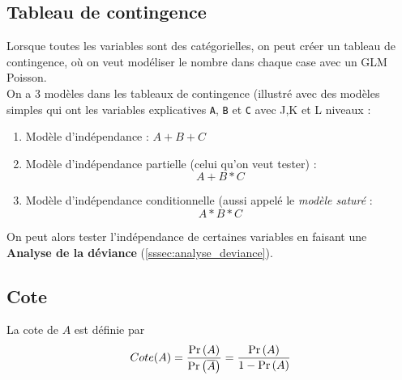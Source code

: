 \documentclass[10pt, french]{article}
\begin{document}
\begin{multicols*}{3}
\subsection*{Tableau de contingence}
Lorsque toutes les variables sont des catégorielles, on peut créer un tableau de contingence, où on veut modéliser le nombre dans chaque case avec un GLM Poisson. \\

On a 3 modèles dans les tableaux de contingence (illustré avec des modèles simples qui ont les variables explicatives \verb=A=, \verb=B= et \verb=C= avec J,K et L niveaux  : 
\begin{enumerate}[label=\faAngleRight]
\item Modèle d'indépendance : $A + B + C$

\item Modèle d'indépendance partielle (celui qu'on veut tester) : 
\[A + B * C\]

\item Modèle d'indépendance conditionnelle (aussi appelé le \emph{modèle saturé} : 
\[A * B * C\]
\end{enumerate}
On peut alors tester l'indépendance de certaines variables en faisant une \textbf{Analyse de la déviance} (\autoref{sssec:analyse_deviance}).


\subsection*{Cote}
La cote de $A$ est définie par
\[Cote(A) = \frac{\Pr \left( A \right)}{\Pr \left( \overline{A} \right)} = \frac{\Pr \left( A \right)}{1 - \Pr \left( A \right)} \]




\end{multicols*}
\end{document}
